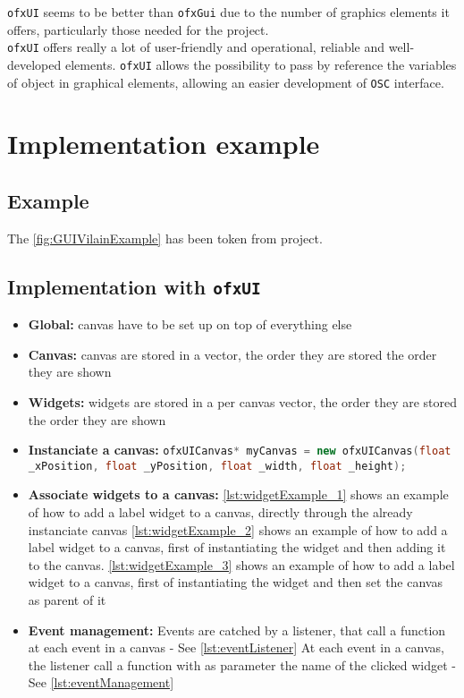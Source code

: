 \documentclass[a4paper,titlepage,oneside]{article}
\begin{document}
\texttt{ofxUI} seems to be better than \texttt{ofxGui} due to the
number of graphics elements it offers, particularly those needed for
the project.\\

\texttt{ofxUI} offers really a lot of user-friendly and
operational, reliable and well-developed elements.  \texttt{ofxUI}
allows the possibility to pass by reference the variables of object in
graphical elements, allowing an easier development of \texttt{OSC}
interface.

\section{Implementation example}
\subsection{Example}
The \figurename \ref{fig:GUIVilainExample} has been token from
\vilain{} project.


\subsection{Implementation with \texttt{ofxUI}}
\begin{itemize}
    \item \textbf{Global:} canvas have to be set up on top of
    everything else
    \item \textbf{Canvas:} canvas are stored in a vector, the order
    they are stored the order they are shown
    \item \textbf{Widgets:} widgets are stored in a per canvas vector,
    the order they are stored the order they are shown

    \item \textbf{Instanciate a canvas:}
    \lstinline[language=C++]{ofxUICanvas* myCanvas = new ofxUICanvas(float _xPosition, float _yPosition, float _width, float _height);}
	
    \item \textbf{Associate widgets to a canvas:} \subitem
    \lstlistingname{} \vref{lst:widgetExample_1} shows an example of
    how to add a label widget to a canvas, directly through the
    already instanciate canvas \subitem \lstlistingname{}
    \vref{lst:widgetExample_2} shows an example of how to add a label
    widget to a canvas, first of instantiating the widget and then
    adding it to the canvas.  \subitem \lstlistingname{}
    \vref{lst:widgetExample_3} shows an example of how to add a label
    widget to a canvas, first of instantiating the widget and then set
    the canvas as parent of it

    \item \textbf{Event management:} \subitem Events are catched by a
    listener, that call a function at each event in a canvas - See
    \lstlistingname{} \vref{lst:eventListener} \subitem At each event
    in a canvas, the listener call a function with as parameter the
    name of the clicked widget - See \lstlistingname{}
    \ref{lst:eventManagement}
\end{itemize}
\end{document}
